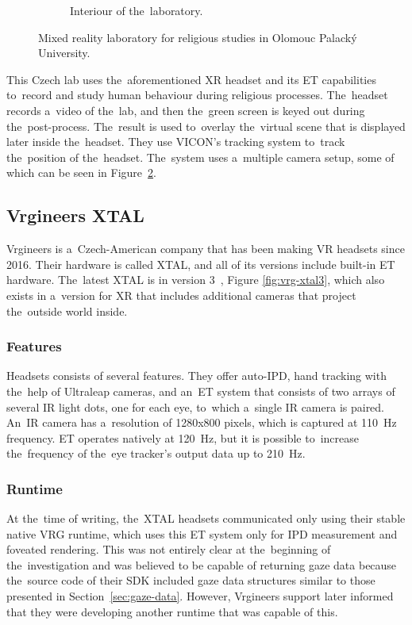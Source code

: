 \begin{figure}[!ht]
\begin{subfigure}[b]{0.6\textwidth}
        \caption{Interiour of the~laboratory.}
        \label{fig:ivr-lab}
    \end{subfigure}
    \caption{Mixed reality laboratory for religious studies in Olomouc Palacký University.}
\end{figure}

This Czech lab uses the~aforementioned XR headset and its ET capabilities to~record and study human behaviour during religious processes. The~headset records a~video of the~lab, and then the~green screen is keyed out during the~post-process. The~result is used to~overlay the~virtual scene that is displayed later inside the~headset. They use VICON's tracking system to~track the~position of the~headset. The~system uses a~multiple camera setup, some of which can be seen in Figure~\ref{fig:ivr-lab}.

\subsection{Vrgineers XTAL}
\label{sec:xtal}

Vrgineers is a~Czech-American company that has been making VR headsets since 2016. Their hardware is called XTAL, and all of its versions include built-in ET hardware. The~latest XTAL is in version 3~\cite{vrginners-xtal3-spec}, Figure \ref{fig:vrg-xtal3}, which also exists in a~version for XR that includes additional cameras that project the~outside world inside. 

\subsubsection*{Features}
Headsets consists of several features. They offer auto-IPD, hand tracking with the~help of Ultraleap cameras, and an~ET system that consists of two arrays of several IR light dots, one for each eye, to~which a~single IR camera is paired. An~IR camera has a~resolution of 1280x800 pixels, which is captured at 110~Hz frequency. ET operates natively at 120~Hz, but it is possible to~increase the~frequency of the~eye tracker's output data up to 210~Hz.~\cite{vrginners-xtal-spec}

\subsubsection*{Runtime}
At the~time of writing, the~XTAL headsets communicated only using their stable native VRG runtime, which uses this ET system only for IPD measurement and foveated rendering. This was not entirely clear at the~beginning of the~investigation and was believed to be capable of returning gaze data because the~source code of their SDK included gaze data structures similar to those presented in Section~\ref{sec:gaze-data}. However, Vrgineers support later informed that they were developing another runtime that was capable of this.

